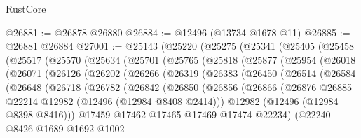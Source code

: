 \begin{lexlean}{RustCore}
\begin{coremodule}
@26881 := @26878 @26880
@26884 := @12496 (@13734 @1678 @11)
@26885 := @26881 @26884
@27001 := @25143
    (@25220
      (@25275
        (@25341
          (@25405
            (@25458
              (@25517
                (@25570
                  (@25634
                    (@25701
                      (@25765
                        (@25818
                          (@25877
                            (@25954
                              (@26018
                                (@26071
                                  (@26126
                                    (@26202
                                      (@26266
                                        (@26319
                                          (@26383
                                            (@26450
                                              (@26514
                                                (@26584
                                                  (@26648
                                                    (@26718
                                                      (@26782
                                                        (@26842
                                                          (@26850
                                                            (@26856
                                                              (@26866
                                                                (@26876
                                                                  @26885
                                                                  @22214
                                                                  @12982
                                                                  (@12496 (@12984 @8408 @2414)))
                                                                @12982
                                                                (@12496 (@12984 @8398 @8416)))
                                                              @17459
                                                              @17462
                                                              @17465
                                                              @17469
                                                              @17474
                                                              @22234)
                                                            (@22240
                                                              @8426
                                                              @1689
                                                              @1692
                                                              @1002

\end{coremodule}
\end{lexlean}
